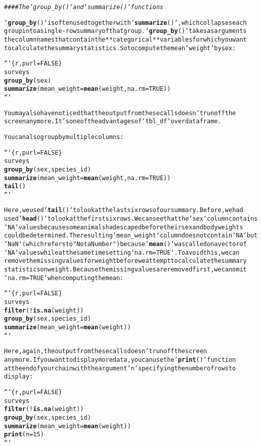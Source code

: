 \documentclass{article}\usepackage[]{graphicx}\usepackage[]{xcolor}
\makeatletter
\newcommand{\hlstr}[1]{\textcolor[rgb]{0.192,0.494,0.8}{#1}}%
\newcommand{\hlcom}[1]{\textcolor[rgb]{0.678,0.584,0.686}{\textit{#1}}}%
\newcommand{\hlkwd}[1]{\textcolor[rgb]{0.737,0.353,0.396}{\textbf{#1}}}%
\newenvironment{kframe}{%
 \def\at@end@of@kframe{}%
 \ifinner\ifhmode%
  \def\at@end@of@kframe{\end{minipage}}%
  \begin{minipage}{\columnwidth}%
 \fi\fi%
 \def\FrameCommand##1{\hskip\@totalleftmargin \hskip-\fboxsep
 \colorbox{shadecolor}{##1}\hskip-\fboxsep
     \hskip-\linewidth \hskip-\@totalleftmargin \hskip\columnwidth}%
 \MakeFramed {\advance\hsize-\width
   \@totalleftmargin\z@ \linewidth\hsize
   \@setminipage}}%
 {\par\unskip\endMakeFramed%
 \at@end@of@kframe}
\newenvironment{knitrout}{}{} %
\makeatother
\begin{document}
\begin{knitrout}
\begin{kframe}
\begin{alltt}
\hlcom{#### The `group_by()` and `summarize()` functions}

`\hlkwd{group_by}()` is often used together with `\hlkwd{summarize}()`, which collapses each
group into a single-row summary of that group.  `\hlkwd{group_by}()` takes as arguments
the column names that contain the **categorical** variables for which you want
to calculate the summary statistics. So to compute the mean `weight` by sex:

```\{r, purl = FALSE\}
surveys %>%
  \hlkwd{group_by}(sex) %>%
  \hlkwd{summarize}(mean_weight = \hlkwd{mean}(weight, na.rm = TRUE))
```

You may also have noticed that the output from these calls doesn't run off the
screen anymore. It's one of the advantages of `tbl_df` over data frame.

You can also group by multiple columns:

```\{r, purl = FALSE\}
surveys %>%
  \hlkwd{group_by}(sex, species_id) %>%
  \hlkwd{summarize}(mean_weight = \hlkwd{mean}(weight, na.rm = TRUE)) %>%
  \hlkwd{tail}()
```

Here, we used `\hlkwd{tail}()` to look at the last six rows of our summary. Before, we had
used `\hlkwd{head}()` to look at the first six rows. We can see that the `sex` column contains
`NA` values because some animals had escaped before their sex and body weights
could be determined. The resulting `mean_weight` column does not contain `NA` but
`NaN` (which refers to \hlstr{"Not a Number"}) because `\hlkwd{mean}()` was called on a vector of
`NA` values while at the same time setting `na.rm = TRUE`. To avoid this, we can
remove the missing values for weight before we attempt to calculate the summary
statistics on weight. Because the missing values are removed first, we can omit
`na.rm = TRUE` when computing the mean:

```\{r, purl = FALSE\}
surveys %>%
  \hlkwd{filter}(!\hlkwd{is.na}(weight)) %>%
  \hlkwd{group_by}(sex, species_id) %>%
  \hlkwd{summarize}(mean_weight = \hlkwd{mean}(weight))
```

Here, again, the output from these calls doesn't run off the screen
anymore. If you want to display more data, you can use the `\hlkwd{print}()` function
at the end of your chain with the argument `n` specifying the number of rows to
display:

```\{r, purl = FALSE\}
surveys %>%
  \hlkwd{filter}(!\hlkwd{is.na}(weight)) %>%
  \hlkwd{group_by}(sex, species_id) %>%
  \hlkwd{summarize}(mean_weight = \hlkwd{mean}(weight)) %>%
  \hlkwd{print}(n = 15)
```


\end{alltt}
\end{kframe}
\end{knitrout}
\end{document}
